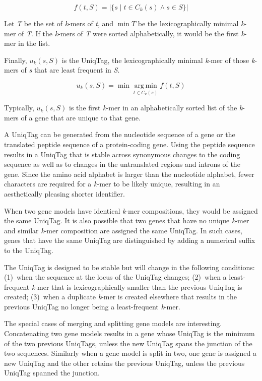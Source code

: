 \documentclass{bioinfo}
\begin{document}
\[
f(t, S) = \left\vert \{ s \mid t \in C_k(s) \wedge s \in S \} \right\vert
\]

Let \emph{T} be the set of \emph{k}-mers of \emph{t}, and $\min T$ be
the lexicographically minimal \emph{k}-mer of \emph{T}. If the
\emph{k}-mers of \emph{T} were sorted alphabetically, it would be the
first \emph{k}-mer in the list.

Finally, $u_k(s, S)$ is the UniqTag, the lexicographically minimal
\emph{k}-mer of those \emph{k}-mers of \emph{s} that are least frequent
in \emph{S}.

\[
u_k(s, S) = \min \mathop{\arg\,\min}\limits_{t \in C_k(s)} f(t, S)
\]

Typically, $u_k(s, S)$ is the first \emph{k}-mer in an alphabetically
sorted list of the \emph{k}-mers of a gene that are unique to that gene.

A UniqTag can be generated from the nucleotide sequence of a gene or the
translated peptide sequence of a protein-coding gene. Using the peptide
sequence results in a UniqTag that is stable across synonymous changes
to the coding sequence as well as to changes in the untranslated regions
and introns of the gene. Since the amino acid alphabet is larger than
the nucleotide alphabet, fewer characters are required for a
\emph{k}-mer to be likely unique, resulting in an aesthetically pleasing
shorter identifier.

When two gene models have identical \emph{k}-mer compositions, they
would be assigned the same UniqTag. It is also possible that two genes
that have no unique \emph{k}-mer and similar \emph{k}-mer composition
are assigned the same UniqTag. In such cases, genes that have the same
UniqTag are distinguished by adding a numerical suffix to the UniqTag.

The UniqTag is designed to be stable but will change in the following
conditions: (1)~when the sequence at the locus of the UniqTag changes;
(2)~when a least-frequent \emph{k}-mer that is lexicographically smaller
than the previous UniqTag is created; (3)~when a duplicate \emph{k}-mer
is created elsewhere that results in the previous UniqTag no longer
being a least-frequent \emph{k}-mer.

The special cases of merging and splitting gene models are interesting.
Concatenating two gene models results in a gene whose UniqTag is the
minimum of the two previous UniqTags, unless the new UniqTag spans the
junction of the two sequences. Similarly when a gene model is split in
two, one gene is assigned a new UniqTag and the other retains the
previous UniqTag, unless the previous UniqTag spanned the junction.
\end{document}
